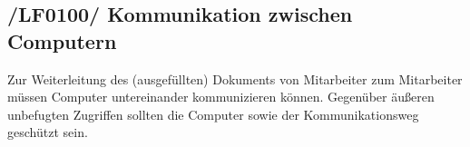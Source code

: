 \subsection{/LF0100/ Kommunikation zwischen Computern}
Zur Weiterleitung des (ausgefüllten) Dokuments von Mitarbeiter zum Mitarbeiter müssen Computer untereinander kommunizieren können. Gegenüber äußeren unbefugten Zugriffen sollten die Computer sowie der Kommunikationsweg geschützt sein.